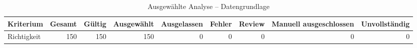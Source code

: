 \begin{table}[htbp]
\centering
\caption{Ausgewählte Analyse -- Datengrundlage}
\begin{tabular}{lrrrrrrrr}
\toprule
Kriterium & Gesamt & Gültig & Ausgewählt & Ausgelassen & Fehler & Review & Manuell ausgeschlossen & Unvollständig \\
\midrule
Richtigkeit & 150 & 150 & 150 & 0 & 0 & 0 & 0 & 0 \\
\bottomrule
\end{tabular}
\end{table}
